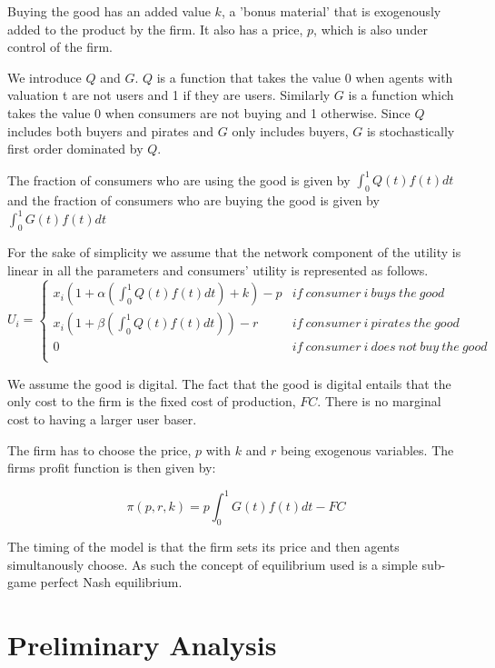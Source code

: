 \documentclass[12pt]{article}
\numberwithin{equation}{section}
\begin{document}
Buying the good has an added value $k$, a 'bonus material' that is exogenously added to the product by the firm. It also has a price, $p$, which is also under control of the firm.

We introduce $Q$ and $G$. $Q$ is a function that takes the value 0 when agents with valuation t are not users and 1 if they are users. Similarly $G$ is a function which takes the value 0 when consumers are not buying and 1 otherwise. Since $Q$ includes both buyers and pirates and $G$ only includes buyers, $G$ is stochastically first order dominated by $Q$.

The fraction of consumers who are using the good is given by $ \int^{1}_{0}Q(t)f(t)dt$ and the fraction of consumers who are buying the good is given by $ \int^{1}_{0}G(t)f(t)dt$

For the sake of simplicity we assume that the network component of the utility is linear in all the parameters and consumers' utility is represented as follows. 
\[
U_i= \left\{
                \begin{array}{ll}
                  x_i(1+\alpha (\int^{1}_{0}Q(t)f(t)dt) +k ) -p  & if ~ consumer ~ i ~ buys ~ the ~  good  \\
                  x_i(1+\beta (\int^{1}_{0}Q(t)f(t)dt) ) -r &  if ~ consumer ~i ~ pirates ~ the ~  good \\
									0 &  if ~ consumer ~ i ~ does ~ not ~ buy ~ the ~ good   \\
                \end{array}
\right.
\]


We assume the good is digital. The fact that the good is digital entails that the only cost to the firm is the fixed cost of production, $FC$. There is no marginal cost to having a larger user baser. 

The firm has to choose the price,  $p$ with $k$ and $r$ being exogenous variables. The firms profit function is then given by:



\begin{equation} \label{eq:profit1}
\pi(p,r,k)
=p \int^{1}_{0}G(t)f(t)dt -FC
\end{equation}

The timing of the model is that the firm sets its price and then agents simultanously choose. As such the concept of equilibrium used is a simple sub-game perfect Nash equilibrium.  

\section{Preliminary Analysis}
\end{document}

